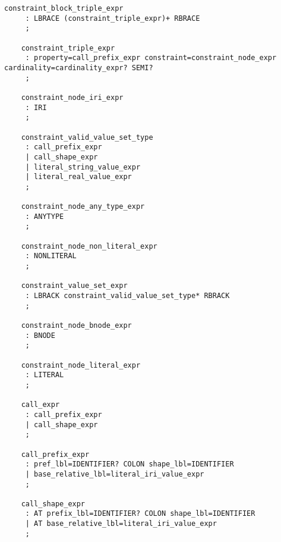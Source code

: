 \begin{lstlisting}[basicstyle=\scriptsize]
    constraint_block_triple_expr
     : LBRACE (constraint_triple_expr)+ RBRACE
     ;
    
    constraint_triple_expr
     : property=call_prefix_expr constraint=constraint_node_expr cardinality=cardinality_expr? SEMI?
     ;
    
    constraint_node_iri_expr
     : IRI
     ;
    
    constraint_valid_value_set_type
     : call_prefix_expr
     | call_shape_expr
     | literal_string_value_expr
     | literal_real_value_expr
     ;
    
    constraint_node_any_type_expr
     : ANYTYPE
     ;
    
    constraint_node_non_literal_expr
     : NONLITERAL
     ;
    
    constraint_value_set_expr
     : LBRACK constraint_valid_value_set_type* RBRACK
     ;
    
    constraint_node_bnode_expr
     : BNODE
     ;
    
    constraint_node_literal_expr
     : LITERAL
     ;
    
    call_expr
     : call_prefix_expr
     | call_shape_expr
     ;
    
    call_prefix_expr
     : pref_lbl=IDENTIFIER? COLON shape_lbl=IDENTIFIER
     | base_relative_lbl=literal_iri_value_expr
     ;
    
    call_shape_expr
     : AT prefix_lbl=IDENTIFIER? COLON shape_lbl=IDENTIFIER
     | AT base_relative_lbl=literal_iri_value_expr
     ;
\end{lstlisting}